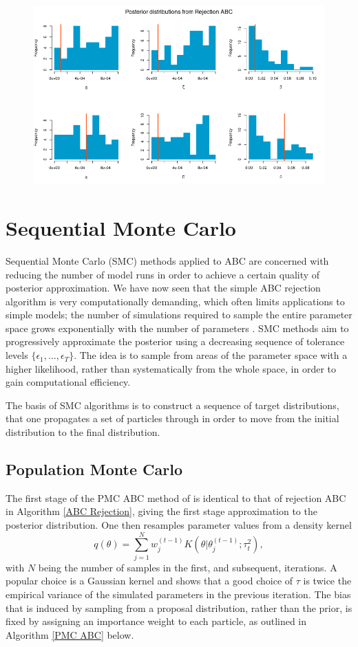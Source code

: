 \documentclass[]{article}
\begin{document}
\begin{figure}[H]
	\centering
	\includegraphics[width=1\linewidth]{../Figures/rejection_posteriors}
\end{figure}


\section{Sequential Monte Carlo}

Sequential Monte Carlo (SMC) methods applied to ABC are concerned with reducing the number of model runs in order to achieve a certain quality of posterior approximation. We have now seen that the simple ABC rejection algorithm is very computationally demanding, which often limits applications to simple models; the number of simulations required to sample the entire parameter space grows exponentially with the number of parameters \citep{RN32}. SMC methods aim to progressively approximate the posterior using a decreasing sequence of tolerance levels $\{\epsilon_1, ..., \epsilon_T\}$. The idea is to sample from areas of the parameter space with a higher likelihood, rather than systematically from the whole space, in order to gain computational efficiency.

The basis of SMC algorithms is to construct a sequence of target distributions, that one propagates a set of particles through in order to move from the initial distribution to the final distribution. 

\subsection{Population Monte Carlo}

The first stage of the PMC ABC method of \cite{RN21} is identical to that of rejection ABC in Algorithm \ref{ABC Rejection}, giving the first stage approximation to the posterior distribution. One then resamples parameter values from a density kernel 
$$ q(\theta) = \sum_{j=1}^{N} w_j^{(t-1)} K(\theta| \theta_{j}^{(t-1)};\tau_t^2),$$ 
with $N$ being the number of samples in the first, and subsequent, iterations. A popular choice is a Gaussian kernel and \cite{RN21} shows that a good choice of $\tau$ is twice the empirical variance of the simulated parameters in the previous iteration. The bias that is induced by sampling from a proposal distribution, rather than the prior, is fixed by assigning an importance weight to each particle, as outlined in Algorithm \ref{PMC ABC} below. 
\end{document}

